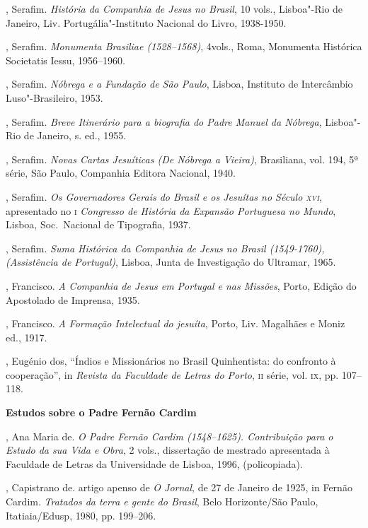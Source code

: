 \begin{bibliohedra}
, Serafim. \textit{História da Companhia de Jesus no Brasil}, 10
vols., Lisboa"-Rio de Janeiro, Liv. Portugália"-Instituto Nacional do
Livro, 1938-1950.

, Serafim. \textit{Monumenta Brasiliae (1528--1568)}, 4vols.,
Roma, Monumenta Histórica Societatis Iessu, 1956--1960.

, Serafim. \textit{Nóbrega e a Fundação de São Paulo}, Lisboa,
Instituto de Intercâmbio Luso"-Brasileiro, 1953.

, Serafim. \textit{Breve Itinerário para a biografia do Padre
Manuel da Nóbrega}, Lisboa"-Rio de Janeiro, s. ed., 1955. 

, Serafim. \textit{Novas Cartas Jesuíticas (De Nóbrega a Vieira)}, 
Brasiliana, vol. 194, 5ª série, São Paulo, Companhia Editora Nacional, 1940.

, Serafim. \textit{Os Governadores Gerais do Brasil e os Jesuítas
no Século \textsc{xvi}}, apresentado no \textsc{i} \textit{Congresso de História da
Expansão Portuguesa no Mundo}, Lisboa, Soc.~Nacional de Tipografia, 1937.

, Serafim. \textit{Suma Histórica da Companhia de Jesus no Brasil
(1549-1760), (Assistência de Portugal)}, Lisboa, Junta de Investigação
do Ultramar, 1965.

, Francisco. \textit{A Companhia de Jesus em Portugal e nas
Missões}, Porto, Edição do Apostolado de Imprensa, 1935.

, Francisco. \textit{A Formação Intelectual do jesuíta}, 
Porto, Liv. Magalhães e Moniz ed., 1917.

, Eugénio dos, ``Índios e Missionários no Brasil Quinhentista: do
confronto à cooperação'', in \textit{Revista da Faculdade de Letras do
Porto}, \textsc{ii} série, vol. \textsc{ix}, pp. 107--118.

\vspace*{2ex}
\scriptsize\textbf{Estudos sobre o Padre Fernão Cardim}

, Ana Maria de. \textit{O Padre Fernão Cardim (1548--1625).
Contribuição para o Estudo da sua Vida e Obra}, 2 vols., dissertação de
mestrado apresentada à Faculdade de Letras da Universidade de Lisboa, 1996, (policopiada).

, Capistrano de. artigo apenso de \textit{O Jornal}, de 27 de
Janeiro de 1925, in Fernão Cardim. \textit{Tratados da terra e gente do
Brasil}, Belo Horizonte/São Paulo, Itatiaia/Edusp, 1980, pp. 199--206.


\end{bibliohedra}
